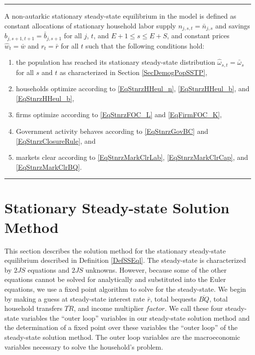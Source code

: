   \vspace{5mm}
  \hrule
  \vspace{-1mm}
  \begin{definition}\label{DefSSEql}
    A non-autarkic stationary steady-state equilibrium in the \ogindia model is defined as constant allocations of stationary household labor supply $n_{j,s,t}=\bar{n}_{j,s}$ and savings $\hat{b}_{j,s+1,t+1}=\bar{b}_{j,s+1}$ for all $j$, $t$, and $E+1\leq s\leq E+S$, and constant prices $\hat{w}_t=\bar{w}$ and $r_t=\bar{r}$ for all $t$ such that the following conditions hold:
    \begin{enumerate}
      \item the population has reached its stationary steady-state distribution $\hat{\omega}_{s,t} = \bar{\omega}_s$ for all $s$ and $t$ as characterized in Section \ref{SecDemogPopSSTP},
      \item households optimize according to \eqref{EqStnrzHHeul_n}, \eqref{EqStnrzHHeul_b}, and \eqref{EqStnrzHHeul_b},
      \item firms optimize according to \eqref{EqStnrzFOC_L} and \eqref{EqFirmFOC_K},
      \item Government activity behaves according to \eqref{EqStnrzGovBC} and \eqref{EqStnrzClosureRule}, and
      \item markets clear according to \eqref{EqStnrzMarkClrLab}, \eqref{EqStnrzMarkClrCap}, and \eqref{EqStnrzMarkClrBQ}.
    \end{enumerate}
  \end{definition}
  \vspace{-2mm}
  \hrule
  \vspace{5mm}


\section{Stationary Steady-state Solution Method}\label{SecEqlbSSsoln}

  \renewcommand\theenumi{\arabic{enumi}}
  \renewcommand\theenumii{\alph{enumii}}
  \renewcommand\theenumiii{\roman{enumiii}}

  This section describes the solution method for the stationary steady-state equilibrium described in Definition \ref{DefSSEql}. The steady-state is characterized by $2JS$ equations and $2JS$ unknowns. However, because some of the other equations cannot be solved for analytically and substituted into the Euler equations, we use a fixed point algorithm to solve for the steady-state. We begin by making a guess at steady-state interest rate $\bar{r}$, total bequests $\overline{BQ}$, total household transfers $\overline{TR}$, and income multiplier $factor$. We call these four steady-state variables the ``outer loop'' variables in our steady-state solution method and the determination of a fixed point over these variables the ``outer loop'' of the steady-state solution method. The outer loop variables are the macroeconomic variables necessary to solve the household's problem.

